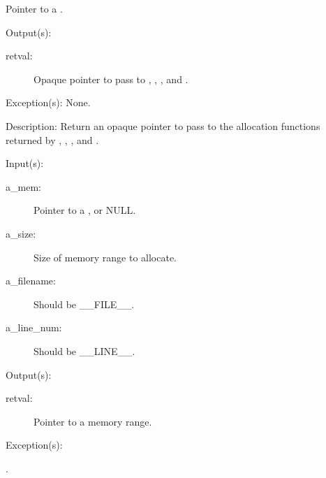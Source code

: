 \begin{capi}
\begin{capilist}
\begin{description}
			Pointer to a .
		\end{description}
	\item[Output(s): ]
		\begin{description}\item[]
		\item[retval: ]
			Opaque pointer to pass to ,
			, , and
			.
		\end{description}
	\item[Exception(s): ] None.
	\item[Description: ]
		Return an opaque pointer to pass to the allocation functions
		returned by ,
		,
		, and
		.
	\end{capilist}
\label{mem_malloc_e}
\label{mem_malloc}
\label{cw_malloc}
	\begin{capilist}
	\item[Input(s): ]
		\begin{description}\item[]
		\item[a\_mem: ]
			Pointer to a , or NULL.
		\item[a\_size: ]
			Size of memory range to allocate.
		\item[a\_filename: ]
			Should be \_\_FILE\_\_.
		\item[a\_line\_num: ]
			Should be \_\_LINE\_\_.
		\end{description}
	\item[Output(s): ]
		\begin{description}\item[]
		\item[retval: ]
			Pointer to a memory range.
		\end{description}
	\item[Exception(s): ]
		\begin{description}\item[]
		\item[.]

\end{description}
\end{capilist}
\end{capi}
